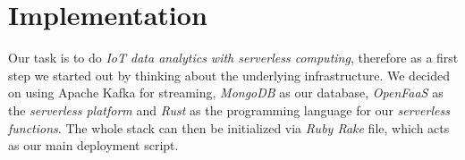 \section{Implementation}

Our task is to do \textit{IoT data analytics with serverless computing}, therefore as a first step
we started out by thinking about the underlying infrastructure. We decided on using Apache Kafka for
streaming, \textit{MongoDB} as our database, \textit{OpenFaaS} as the \textit{serverless platform} and
\textit{Rust} as the programming language for our \textit{serverless functions}. The whole stack can then be
initialized via \textit{Ruby Rake} file, which acts as our main deployment script.







